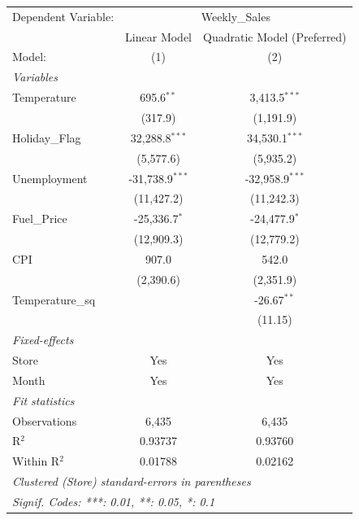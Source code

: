 
\begingroup
\centering
\begin{tabular}{lcc}
   \tabularnewline \midrule \midrule
   Dependent Variable: & \multicolumn{2}{c}{Weekly\_Sales}\\
                    & Linear Model      & Quadratic Model (Preferred) \\   
   Model:           & (1)               & (2)\\  
   \midrule
   \emph{Variables}\\
   Temperature      & 695.6$^{**}$      & 3,413.5$^{***}$\\   
                    & (317.9)           & (1,191.9)\\   
   Holiday\_Flag    & 32,288.8$^{***}$  & 34,530.1$^{***}$\\   
                    & (5,577.6)         & (5,935.2)\\   
   Unemployment     & -31,738.9$^{***}$ & -32,958.9$^{***}$\\   
                    & (11,427.2)        & (11,242.3)\\   
   Fuel\_Price      & -25,336.7$^{*}$   & -24,477.9$^{*}$\\   
                    & (12,909.3)        & (12,779.2)\\   
   CPI              & 907.0             & 542.0\\   
                    & (2,390.6)         & (2,351.9)\\   
   Temperature\_sq  &                   & -26.67$^{**}$\\   
                    &                   & (11.15)\\   
   \midrule
   \emph{Fixed-effects}\\
   Store            & Yes               & Yes\\  
   Month            & Yes               & Yes\\  
   \midrule
   \emph{Fit statistics}\\
   Observations     & 6,435             & 6,435\\  
   R$^2$            & 0.93737           & 0.93760\\  
   Within R$^2$     & 0.01788           & 0.02162\\  
   \midrule \midrule
   \multicolumn{3}{l}{\emph{Clustered (Store) standard-errors in parentheses}}\\
   \multicolumn{3}{l}{\emph{Signif. Codes: ***: 0.01, **: 0.05, *: 0.1}}\\
\end{tabular}
\par\endgroup



